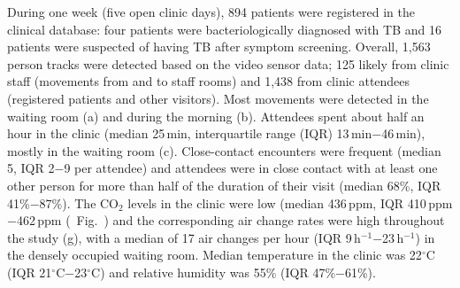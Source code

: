 \documentclass[fleqn,11pt]{wlscirep}
\begin{document}
During one week (five open clinic days), 894 patients were registered in the clinical database: four patients were bacteriologically diagnosed with TB and 16 patients were suspected of having TB after symptom screening. Overall, 1,563 person tracks were detected based on the video sensor data; 125 likely from clinic staff (movements from and to staff rooms) and 1,438 from clinic attendees (registered patients and other visitors). Most movements were detected in the waiting room (a) and during the morning (b). Attendees spent about half an hour in the clinic (median 25\,min, interquartile range (IQR) 13\,min$-$46\,min), mostly in the waiting room (c). Close-contact encounters were frequent (median 5, IQR 2$-$9 per attendee) and attendees were in close contact with at least one other person for more than half of the duration of their visit (median 68\%, IQR 41\%$-$87\%). The CO$_2$ levels in the clinic were low (median 436\,ppm, IQR 410\,ppm$-$462\,ppm (\supp~Fig.~) and the corresponding air change rates were high throughout the study (g), with a \eg median of 17 air changes per hour (IQR 9\,h$^{-1}$$-$23\,h$^{-1}$) in the densely occupied waiting room. Median temperature in the clinic was 22$^{\circ}$C (IQR 21$^{\circ}$C$-$23$^{\circ}$C) and relative humidity was 55\% (IQR 47\%$-$61\%).
\end{document}
